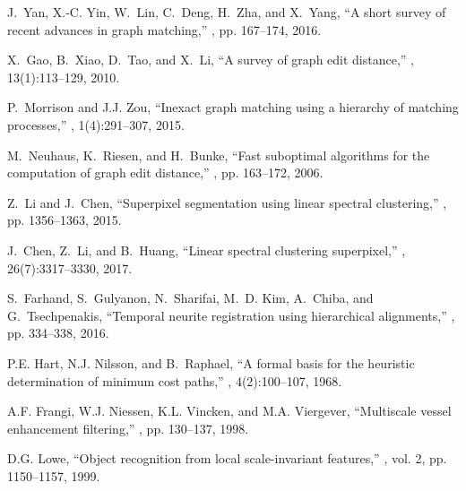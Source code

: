 \documentclass{article}
\begin{document}
{\begin{thebibliography}{10}
	J.~Yan, X.-C. Yin, W.~Lin, C.~Deng, H.~Zha, and X.~Yang,
	\newblock ``A short survey of recent advances in graph matching,''
	, pp. 167--174, 2016.
	
	X.~Gao, B.~Xiao, D.~Tao, and X.~Li,
	\newblock ``A survey of graph edit distance,''
	, 13(1):113--129, 2010.
	
	P.~Morrison and J.J. Zou,
	\newblock ``Inexact graph matching using a hierarchy of matching processes,''
	, 1(4):291--307, 2015.
	
	M.~Neuhaus, K.~Riesen, and H.~Bunke,
	\newblock ``Fast suboptimal algorithms for the computation of graph edit
	distance,''
	, pp. 163--172, 2006.
	
	Z.~Li and J.~Chen,
	\newblock ``Superpixel segmentation using linear spectral clustering,''
	, pp. 1356--1363, 2015.
	
	J.~Chen, Z.~Li, and B.~Huang,
	\newblock ``Linear spectral clustering superpixel,''
	, 26(7):3317--3330, 2017.
	
	S.~Farhand, S.~Gulyanon, N.~Sharifai, M.~D. Kim, A.~Chiba, and G.~Tsechpenakis,
	\newblock ``Temporal neurite registration using hierarchical alignments,''
	, pp. 334--338, 2016.
	
	
	P.E. Hart, N.J. Nilsson, and B.~Raphael,
	\newblock ``A formal basis for the heuristic determination of minimum cost
	paths,''
	, 4(2):100--107, 1968.
	
	A.F. Frangi, W.J. Niessen, K.L. Vincken, and M.A. Viergever,
	\newblock ``Multiscale vessel enhancement filtering,''
	, pp. 130--137, 1998.
	
	D.G. Lowe,
	\newblock ``Object recognition from local scale-invariant features,''
	, vol. 2, pp. 1150--1157, 1999.
	
\end{thebibliography}

}
\end{document}
